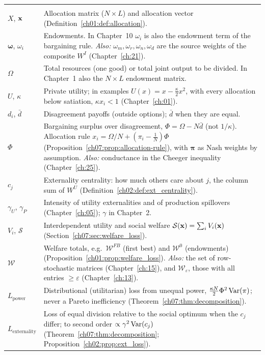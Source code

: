 {\begin{longtable}{@{}>{\raggedright\arraybackslash}p{3.2cm}>{\raggedright\arraybackslash}p{11.3cm}@{}}
\multicolumn{2}{@{}l}{\textit{Allocation and welfare}} \\[2pt]
$X$, $\mathbf{x}$ & Allocation matrix ($N \times L$) and allocation vector (Definition~\ref{ch01:def:allocation}). \\
$\boldsymbol{\omega}$, $\omega_i$ & Endowments. In Chapter~10 $\omega_i$ is also the endowment term of the bargaining rule. \textit{Also:} $\omega_m, \omega_r, \omega_n, \omega_d$ are the source weights of the composite $W^I$ (Chapter~\ref{ch:21}). \\
$\Omega$ & Total resources (one good) or total joint output to be divided. In Chapter~1 also the $N \times L$ endowment matrix. \\
$U$, $\kappa$ & Private utility; in examples $U(x) = x - \frac{\kappa}{2}x^2$, with every allocation below satiation, $\kappa x_i < 1$ (Chapter~\ref{ch:01}). \\
$d_i$, $\bar d$ & Disagreement payoffs (outside options); $\bar d$ when they are equal. \\
$\Phi$ & Bargaining surplus over disagreement, $\Phi = \Omega - N\bar d$ (not $1/\kappa$). Allocation rule $x_i = \Omega/N + (\pi_i - \frac{1}{N})\Phi$ (Proposition~\ref{ch07:prop:allocation-rule}), with $\boldsymbol{\pi}$ as Nash weights by assumption. \textit{Also:} conductance in the Cheeger inequality (Chapter~\ref{ch:25}). \\
$c_j$ & Externality centrality: how much others care about $j$, the column sum of $W^U$ (Definition~\ref{ch02:def:ext_centrality}). \\
$\gamma_U$, $\gamma_P$ & Intensity of utility externalities and of production spillovers (Chapter~\ref{ch:05}); $\gamma$ in Chapter~2. \\
$V_i$, $\mathcal{S}$ & Interdependent utility and social welfare $\mathcal{S}(\mathbf{x}) = \sum_i V_i(\mathbf{x})$ (Section~\ref{ch07:sec:welfare_loss}). \\
$\mathcal{W}$ & Welfare totals, e.g.\ $\mathcal{W}^{FB}$ (first best) and $\mathcal{W}^0$ (endowments) (Proposition~\ref{ch01:prop:welfare_loss}). \textit{Also:} the set of row-stochastic matrices (Chapter~\ref{ch:15}), and $\mathcal{W}_\varepsilon$, those with all entries $\ge \varepsilon$ (Chapter~\ref{ch:13}). \\
$L_{\text{power}}$ & Distributional (utilitarian) loss from unequal power, $\frac{\kappa N}{2}\Phi^2\operatorname{Var}(\pi)$; never a Pareto inefficiency (Theorem~\ref{ch07:thm:decomposition}). \\
$L_{\text{externality}}$ & Loss of equal division relative to the social optimum when the $c_j$ differ; to second order $\propto \gamma^2\operatorname{Var}(c_j)$ (Theorem~\ref{ch07:thm:decomposition}; Proposition~\ref{ch02:prop:ext_loss}). \\

\end{longtable}}
